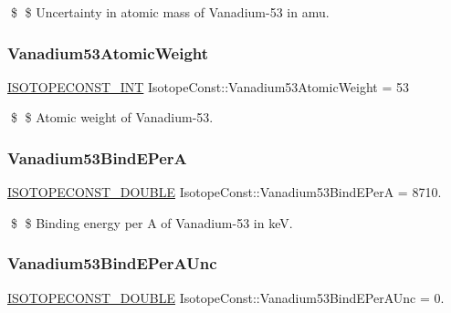\$ \$ Uncertainty in atomic mass of Vanadium-\/53 in amu. \mbox{\label{group___isotope_const-_vanadium-_v53_gaeb0dd059f560c6510f5a39b634b95315}} 
\subsubsection{\texorpdfstring{Vanadium53\+Atomic\+Weight}{Vanadium53AtomicWeight}}
{\footnotesize\ttfamily \mbox{\hyperlink{group___isotope_const-_macros_ga5f18360b3e99483a35c32d789e62621c}{I\+S\+O\+T\+O\+P\+E\+C\+O\+N\+S\+T\+\_\+\+I\+NT}} Isotope\+Const\+::\+Vanadium53\+Atomic\+Weight = 53}

\$ \$ Atomic weight of Vanadium-\/53. \mbox{\label{group___isotope_const-_vanadium-_v53_ga493090b511727dd48a75ab5c704f4fd1}} 
\subsubsection{\texorpdfstring{Vanadium53\+Bind\+E\+PerA}{Vanadium53BindEPerA}}
{\footnotesize\ttfamily \mbox{\hyperlink{group___isotope_const-_macros_ga8f45a7272ce02c0b4c65c44636ed719a}{I\+S\+O\+T\+O\+P\+E\+C\+O\+N\+S\+T\+\_\+\+D\+O\+U\+B\+LE}} Isotope\+Const\+::\+Vanadium53\+Bind\+E\+PerA = 8710.}

\$ \$ Binding energy per A of Vanadium-\/53 in keV. \mbox{\label{group___isotope_const-_vanadium-_v53_ga26398936c7ef82bdf0c793f28cfb200b}} 
\subsubsection{\texorpdfstring{Vanadium53\+Bind\+E\+Per\+A\+Unc}{Vanadium53BindEPerAUnc}}
{\footnotesize\ttfamily \mbox{\hyperlink{group___isotope_const-_macros_ga8f45a7272ce02c0b4c65c44636ed719a}{I\+S\+O\+T\+O\+P\+E\+C\+O\+N\+S\+T\+\_\+\+D\+O\+U\+B\+LE}} Isotope\+Const\+::\+Vanadium53\+Bind\+E\+Per\+A\+Unc = 0.}

